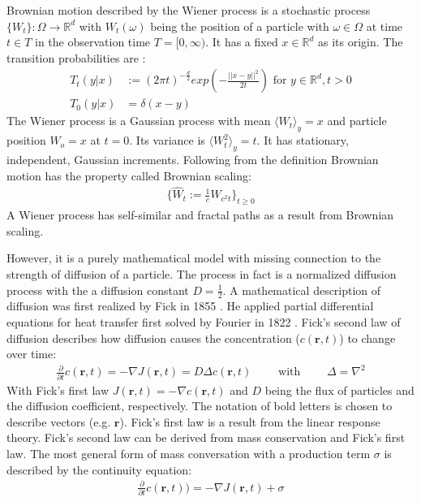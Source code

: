 \documentclass[
  a4paper,BCOR10mm,oneside,
  headsepline,footsepline,%
  fleqn,openbib
]{scrbook}
\begin{document}
Brownian motion described by the Wiener process is a stochastic process $ \{ W_t \}: \Omega \rightarrow \mathbb{R}^d$ with $ W_t(\omega)$ being the position of a particle with $\omega \in \Omega$ at time $t \in T$ in the observation time $T =[0, \infty)$. It has a fixed $x \in \mathbb{R}^d$ as its origin. The transition probabilities are \cite{LectureFelix}: 
\begin{align}
T_{t}(y|x) & := (2 \pi t)^{- \frac{d}{2}} exp \left(- \frac{||x-y||^2}{2 t}\right) \text{ for } y \in \mathbb{R}^d, t>0 \\ \nonumber
T_{0}(y|x) & = \delta(x-y) 
\end{align}
The Wiener process is a Gaussian process with mean $\langle W_t \rangle_y=x$ and particle position $W_o=x$ at $t=0$. Its variance is $\langle W^2_t \rangle_y= t$. It has stationary, independent, Gaussian increments. Following from the definition Brownian motion has the property called Brownian scaling:
\begin{align}
\label{Brownianscaling}
\{\hat{W}_t := \frac{1}{c} W_{c^2 t} \}_{t\geq0} 
\end{align}
A Wiener process has self-similar and fractal paths as a result from Brownian scaling.\par\bigskip
However, it is a purely mathematical model with missing connection to the strength of diffusion of a particle. The process in fact is a normalized diffusion process with the a diffusion constant $D=\frac{1}{2}$. A mathematical description of diffusion was first realized by Fick in 1855 \cite{Fick1855}. He applied partial differential equations for heat transfer first solved by Fourier in 1822 \cite{Fourier1822}. Fick's  second law of diffusion describes how diffusion causes the concentration ($c(\bm{r},t)$) to change over time:
\begin{align}
 \frac{\partial}{\partial t} c(\bm{r},t) = - \nabla J (\bm{r},t) = D  \Delta c(\bm{r},t) \qquad \text{ with } \qquad \Delta= \nabla^2  \label{eq:ficks}
\end{align}
With Fick's first law $J(\bm{r},t)=- \nabla c(\bm{r},t)$ and $D$ being the flux of particles and the diffusion coefficient, respectively. The notation of bold letters is chosen to describe vectors (e.g. $\bm{r}$). Fick's first law is a result from the linear response theory. Fick's second law can be derived from mass conservation and Fick's first law. The most general form of mass conversation with a production term $\sigma$ is described by the continuity equation:
\begin{align}
\frac{\partial}{\partial t} c(\bm{r},t))=- \nabla J(\bm{r},t)+ \sigma 
\end{align}
\end{document}
